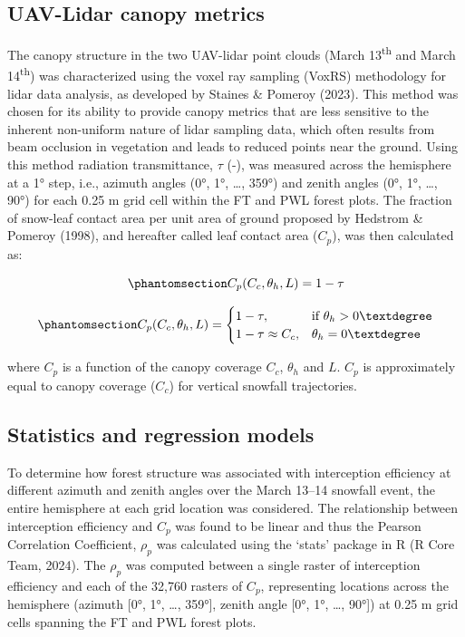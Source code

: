 \documentclass[
  letterpaper,
  DIV=11,
  numbers=noendperiod]{scrartcl}
\begin{document}
\subsection{UAV-Lidar canopy metrics}\label{uav-lidar-canopy-metrics}

The canopy structure in the two UAV-lidar point clouds (March
13\textsuperscript{th} and March 14\textsuperscript{th}) was
characterized using the voxel ray sampling (VoxRS) methodology for lidar
data analysis, as developed by Staines \& Pomeroy (2023). This method
was chosen for its ability to provide canopy metrics that are less
sensitive to the inherent non-uniform nature of lidar sampling data,
which often results from beam occlusion in vegetation and leads to
reduced points near the ground. Using this method radiation
transmittance, \(\tau\) (-), was measured across the hemisphere at a 1°
step, i.e., azimuth angles (0°, 1°, \ldots, 359°) and zenith angles (0°,
1°, \ldots, 90°) for each 0.25 m grid cell within the FT and PWL forest
plots. The fraction of snow-leaf contact area per unit area of ground
proposed by Hedstrom \& Pomeroy (1998), and hereafter called leaf
contact area (\(C_p\)), was then calculated as:

\begin{equation}\phantomsection\label{eq-lca}{
C_p(C_c, \theta_h, L) = 1-\tau
}\end{equation}

\begin{equation}\phantomsection\label{eq-tf-ode}{
C_p(C_c, \theta_h, L) = \begin{cases}
    1-\tau,& \text{if } \theta_h> 0°\\
    1-\tau \approx C_c ,              & \theta_h= 0°
\end{cases}
}\end{equation}

where \(C_p\) is a function of the canopy coverage \(C_c\), \(\theta_h\)
and \(L\). \(C_p\) is approximately equal to canopy coverage (\(C_c\))
for vertical snowfall trajectories.

\subsection{Statistics and regression
models}\label{statistics-and-regression-models}

To determine how forest structure was associated with interception
efficiency at different azimuth and zenith angles over the March 13--14
snowfall event, the entire hemisphere at each grid location was
considered. The relationship between interception efficiency and \(C_p\)
was found to be linear and thus the Pearson Correlation Coefficient,
\(\rho_p\) was calculated using the `stats' package in R (R Core Team,
2024). The \(\rho_p\) was computed between a single raster of
interception efficiency and each of the 32,760 rasters of \(C_p\),
representing locations across the hemisphere (azimuth {[}0°, 1°, \ldots,
359°{]}, zenith angle {[}0°, 1°, \ldots, 90°{]}) at 0.25 m grid cells
spanning the FT and PWL forest plots.
\end{document}
